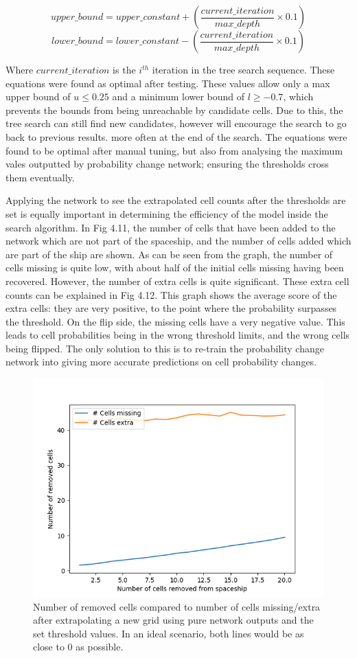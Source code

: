 \documentclass{l4proj}
\begin{document}
\[ upper\_bound = upper\_constant + (\frac{current\_iteration}{max\_depth} \times  0.1)\]
\[ lower\_bound = lower\_constant - (\frac{current\_iteration}{max\_depth} \times  0.1) \]

Where $current\_iteration$ is the $i^{th}$ iteration in the tree search sequence. These equations were found as optimal after testing. These values allow only a max upper bound of $u \leq 0.25$ and a minimum lower bound of $l \geq -0.7$, which prevents the bounds from being unreachable by candidate cells. Due to this, the tree search can still find new candidates, however will encourage the search to go back to previous results. more often at the end of the search. The equations were found to be optimal after manual tuning, but also from analysing the maximum vales outputted by probability change network; ensuring the thresholds cross them eventually.

Applying the network to see the extrapolated cell counts after the thresholds are set is equally important in determining the efficiency of the model inside the search algorithm. In Fig 4.11, the number of cells that have been added to the network which are not part of the spaceship, and the number of cells added which are part of the ship are shown. As can be seen from the graph, the number of cells missing is quite low, with about half of the initial cells missing having been recovered. However, the number of extra cells is quite significant. These extra cell counts can be explained in Fig 4.12. This graph shows the average score of the extra cells: they are very positive, to the point where the probability surpasses the threshold. On the flip side, the missing cells have a very negative value. This leads to cell probabilities being in the wrong threshold limits, and the wrong cells being flipped. The only solution to this is to re-train the probability change network into giving more accurate predictions on cell probability changes.

\begin{figure}[h!]
\centering
\includegraphics[width=0.8\linewidth]{dissertation/images/graphs/cells_removed_n_cells_extra_missing_probability_analysis.png}
\caption{Number of removed cells compared to number of cells missing/extra after extrapolating a new grid using pure network outputs and the set threshold values. In an ideal scenario, both lines would be as close to 0 as possible.}
\label{fig:subim1}
\end{figure}
\end{document}
